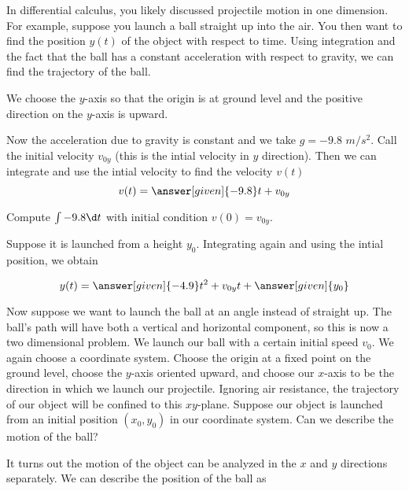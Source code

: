 \documentclass{ximera}
\begin{document}
\begin{example}

 In differential calculus, you likely discussed projectile motion in one dimension. For example, suppose you launch a ball straight up into the air. You then want to find the position
$y(t)$ of the object with respect to time. Using integration and the fact that the ball has a constant acceleration with respect to gravity, we can find the trajectory of the ball.

\begin{explanation}
We choose the $y$-axis so that the origin is at ground level and the positive direction on the $y$-axis is upward.

Now the acceleration due to gravity is constant and we take $g=-9.8$ $m/s^2$. Call the initial velocity $v_{0y}$ (this is the intial velocity in $y$ direction). Then we can integrate and use the intial velocity to find the velocity $v(t)$
\[
v(t)=\answer[given]{-9.8}t+v_{0y}
\]

\begin{hint}
Compute $\int -9.8 \d t$ with initial condition $v(0)=v_{0y}$.
\end{hint}

Suppose it is launched from a height $y_{0}$. Integrating again and using the intial position, we obtain

\[
y(t)=\answer[given]{-4.9}t^2+v_{0y}t+ \answer[given]{y_{0}}
\]

\end{explanation}

Now suppose we want to launch the ball at an angle instead of straight up.  The ball's path will have both a vertical and horizontal component, so this is now a two dimensional problem. We launch our ball with a certain initial speed $v_{0}$. We again choose a coordinate system. Choose the origin at a fixed point on the ground level, choose the $y$-axis oriented upward, and choose our $x$-axis to be the direction in which we launch our projectile. Ignoring air resistance, the trajectory of our object will be confined to this $xy$-plane. Suppose our object is launched from an initial position $(x_{0},y_{0})$ in our coordinate system.  Can we describe the motion of the ball?

\begin{explanation}

It turns out the motion of the object can be analyzed in the $x$ and $y$ directions separately.  We can describe the position of the ball as


\end{explanation}
\end{example}
\end{document}
